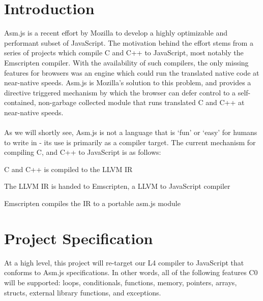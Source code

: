 \documentclass[twoside]{article}
\begin{document}
\begin{multicols}{2} %

\section{Introduction}


Asm.js is a recent effort by Mozilla to develop a highly optimizable and performant
subset of JavaScript. The motivation behind the effort stems from a series of projects which
compile C and C++ to JavaScript, most notably the Emscripten compiler. With the availability of such
compilers, the only missing features for browsers was an engine which could run the
translated native code at near-native speeds. Asm.js is Mozilla's solution to this problem,
and provides a directive triggered mechanism by which the browser can defer control to a
self-contained, non-garbage collected module that runs translated C and C++ at near-native speeds. \\
\\
As we will shortly see, Asm.js is not a language that is `fun' or `easy' for humans to write in -
its use is primarily as a compiler target. The current mechanism for compiling C, and C++ to
JavaScript is as follows:

\begin{compactitem}
  \item C and C++ is compiled to the LLVM IR
  \item The LLVM IR is handed to Emscripten, a LLVM to JavaScript compiler
  \item Emscripten compiles the IR to a portable asm.js module
\end{compactitem}



\section{Project Specification}

At a high level, this project will re-target our L4 compiler to JavaScript that
conforms to Asm.js specifications. In other
words, all of the following features C0 will be supported: loops, conditionals,
functions, memory, pointers, arrays, structs, external library functions, and
exceptions.


\end{multicols}
\end{document}

